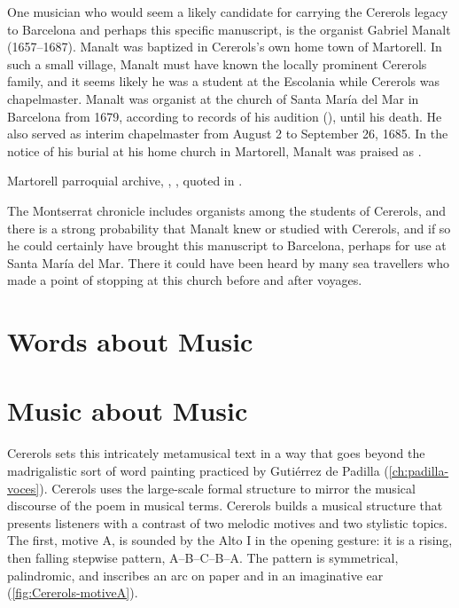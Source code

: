 One musician who would seem a likely candidate for carrying the Cererols legacy
to Barcelona and perhaps this specific manuscript, is the organist Gabriel
Manalt (1657--1687).
Manalt was baptized in Cererols's own home town of Martorell.
In such a small village, Manalt must have known the locally prominent Cererols
family, and it seems likely he was a student at the Escolania while Cererols was
chapelmaster.
Manalt was organist at the church of Santa María del Mar in Barcelona from 1679,
according to records of his audition (), until his death.
He also served as interim chapelmaster from August 2 to September 26, 1685.%
    \Autocite[70--71]{Balanza:CererolsFamily}
In the notice of his burial at his home church in Martorell, Manalt was praised
as .%
\begin{Footnote}
    Martorell parroquial archive, ,
    , quoted in 
    \autocite
    [{\XXX[original]}]
    [70]
    {Balanza:CererolsFamily}.
\end{Footnote}
The Montserrat chronicle includes organists among the students of Cererols, and
there is a strong probability that Manalt knew or studied with Cererols, and if
so he could certainly have brought this manuscript to Barcelona, perhaps for use
at Santa María del Mar.
There it could have been heard by many sea travellers who made a point of
stopping at this church before and after voyages.\XXX[really?]

\section{Words about Music}

\section{Music about Music}

Cererols sets this intricately metamusical text in a way that goes beyond the
madrigalistic sort of word painting practiced by Gutiérrez de Padilla
(\cref{ch:padilla-voces}).
Cererols uses the large-scale formal structure to mirror the musical discourse
of the poem in musical terms.
Cererols builds a musical structure that presents listeners with a contrast of
two melodic motives and two stylistic topics.
The first, motive A, is sounded by the Alto I in the opening gesture: it is a
rising, then falling stepwise pattern, A--B--C--B--A.
The pattern is symmetrical, palindromic, and inscribes an arc on paper and in an
imaginative ear (\cref{fig:Cererols-motiveA}).

